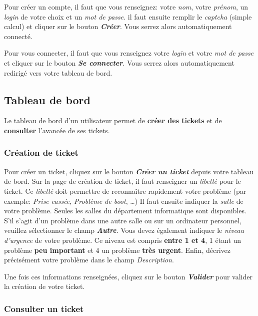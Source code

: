\documentclass[12pt, a4paper]{article}
\begin{document}
Pour créer un compte, il faut que vous renseignez: votre \textit{nom}, votre \textit{prénom}, un \textit{login} de votre choix et un \textit{mot de passe}. 
il faut ensuite remplir le \textit{captcha} (simple calcul) et cliquer sur le bouton \textit{\textbf{Créer}}.
Vous serrez alors automatiquement connecté.

\bigskip
Pour vous connecter, il faut que vous renseignez votre \textit{login} et votre \textit{mot de passe} et cliquer sur le bouton \textit{\textbf{Se connecter}}.
Vous serrez alors automatiquement redirigé vers votre tableau de bord.

\subsection*{Tableau de bord}

Le tableau de bord d'un utilisateur permet de \textbf{créer des tickets} et de \textbf{consulter} l'avancée de ses tickets.

\subsubsection*{Création de ticket}

Pour créer un ticket, cliquez sur le bouton \textit{\textbf{Créer un ticket}} depuis votre tableau de bord.
Sur la page de création de ticket, il faut renseigner un \textit{libellé} pour le ticket.
Ce \textit{libellé} doit permettre de reconnaître rapidement votre problème (par exemple: \textit{Prise cassée}, \textit{Problème de boot}, \ldots)
Il faut ensuite indiquer la \textit{salle} de votre problème.
Seules les salles du département informatique sont disponibles.
S'il s'agit d'un problème dans une autre salle ou sur un ordinateur personnel, veuillez sélectionner le champ \textit{\textbf{Autre}}.
Vous devez également indiquer le \textit{niveau d'urgence} de votre problème.
Ce niveau est compris \textbf{entre 1 et 4}, 1 étant un problème \textbf{peu important} et 4 un problème \textbf{très urgent}.
Enfin, décrivez précisément votre problème dans le champ \textit{Description}.

\bigskip
\noindent Une fois ces informations renseignées, cliquez sur le bouton \textit{\textbf{Valider}} pour valider la création de votre ticket.

\subsubsection*{Consulter un ticket}
\end{document}
